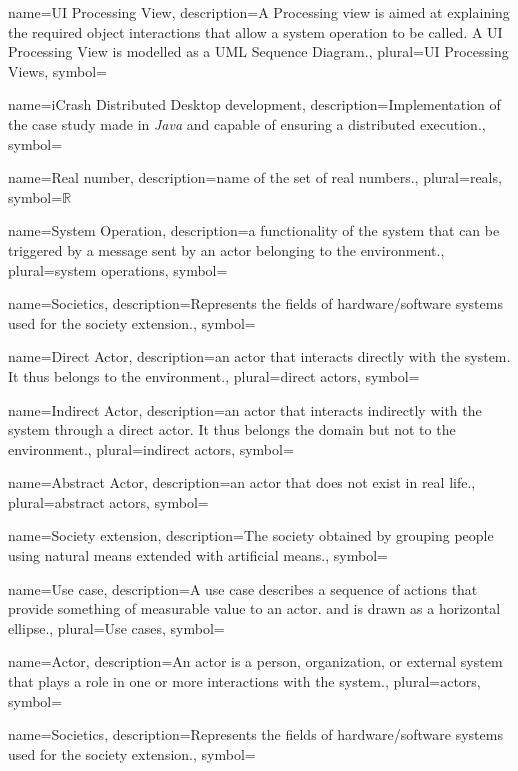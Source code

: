 {name={UI Processing View},
description={A Processing view is aimed at explaining the required
object interactions that allow a system operation to be called. A
UI Processing View is modelled as a UML Sequence Diagram.},
plural={UI Processing Views},
symbol={} }


{name={iCrash Distributed Desktop development},
description={Implementation of the \msricrash case study made in \emph{Java} and
capable of ensuring a distributed execution.},
symbol={} }





{name={Real number},
description={name of the set of real numbers.},
plural={reals},
symbol={\ensuremath{\mathbb{R}}}
}

{name={System Operation},
description={a functionality of the system that can be triggered by a message
sent by an actor belonging to the environment.}, plural={system operations},
symbol={}
}


{name={Societics},
description={Represents the fields of hardware/software
systems used for the society extension.}, 
symbol={}
}

{name={Direct Actor},
description={an actor that interacts directly with the system. It thus belongs
to the environment.},
plural={direct actors},
symbol={}
}

{name={Indirect Actor},
description={an actor that interacts indirectly with the system through a direct
actor.  It thus belongs the domain but not to the environment.}, 
plural={indirect actors},
symbol={}
}

{name={Abstract Actor},
description={an actor that does not exist in real life.},
plural={abstract actors},
symbol={}
}

{name={Society extension},
description={The society obtained by grouping people using natural means
extended with artificial means.},
symbol={}
}

{name={Use case},
description={A use case describes a sequence of actions that provide something
of measurable value to an actor. and is drawn as a horizontal ellipse.},
plural={Use cases}, 
symbol={} 
}

{name={Actor},
description={An actor is a person, organization, or external system that plays a
role in one or more interactions with the system.},
plural={actors},
symbol={}
}

{name={Societics},
description={Represents the fields of hardware/software
systems used for the society extension.},
symbol={}
}


